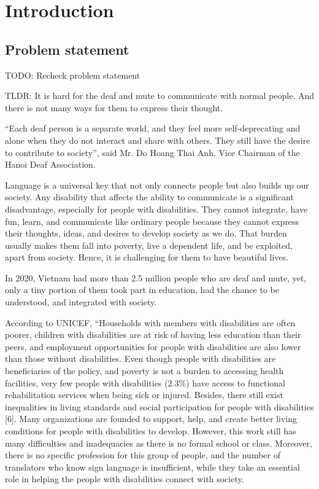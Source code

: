 \chapter {Introduction}
	
\section{Problem statement}

TODO: Recheck problem statement

TLDR: It is hard for the deaf and mute to communicate with normal people. And there is not many ways for them to express their thought.

“Each deaf person is a separate world, and they feel more self-deprecating and alone when they do not interact and share with others. They still have the desire to contribute to society”, said Mr. Do Hoang Thai Anh, Vice Chairman of the Hanoi Deaf Association.

Language is a universal key that not only connects people but also builds up our society. Any disability that affects the ability to communicate is a significant disadvantage, especially for people with disabilities. They cannot integrate, have fun, learn, and communicate like ordinary people because they cannot express their thoughts, ideas, and desires to develop society as we do. That burden usually makes them fall into poverty, live a dependent life, and be exploited, apart from society. Hence, it is challenging for them to have beautiful lives.

In 2020, Vietnam had more than 2.5 million people who are deaf and mute, yet, only a tiny portion of them took part in education, had the chance to be understood, and integrated with society.

According to UNICEF, “Households with members with disabilities are often poorer, children with disabilities are at risk of having less education than their peers, and employment opportunities for people with disabilities are also lower than those without disabilities. Even though people with disabilities are beneficiaries of the policy, and poverty is not a burden to accessing health facilities, very few people with disabilities (2.3\%) have access to functional rehabilitation services when being sick or injured. Besides, there still exist inequalities in living standards and social participation for people with disabilities [6]. Many organizations are founded to support, help, and create better living conditions for people with disabilities to develop. However, this work still has many difficulties and inadequacies as there is no formal school or class. Moreover, there is no specific profession for this group of people, and the number of translators who know sign language is insufficient, while they take an essential role in helping the people with disabilities connect with society.

